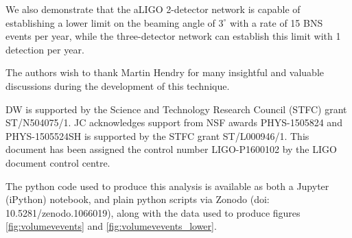 \documentclass[twocolumn]{aastex61}
\begin{document}
We also demonstrate that the \ac{aLIGO} 2-detector network is
capable of establishing a lower limit on the beaming angle of
$3^{\circ}$ with a rate of 15 BNS events per year, while the
three-detector network can establish this limit with 1 detection per
year.


\acknowledgments
The authors wish to thank Martin Hendry for many insightful and
valuable discussions during the development of this technique.

DW is supported by the Science
and Technology Research Council (STFC) grant ST/N504075/1. JC
acknowledges support from NSF awards PHYS-1505824 and PHYS-1505524SH
is supported by the STFC grant ST/L000946/1. This document has been
assigned the control number LIGO-P1600102 by the LIGO document control
centre.


The python code used to produce this analysis is available as both a
Jupyter (iPython) notebook, and plain python scripts via Zonodo (doi:
10.5281/zenodo.1066019), along with the data used to produce figures
\ref{fig:volumevevents} and \ref{fig:volumevevents_lower}.


\end{document}
